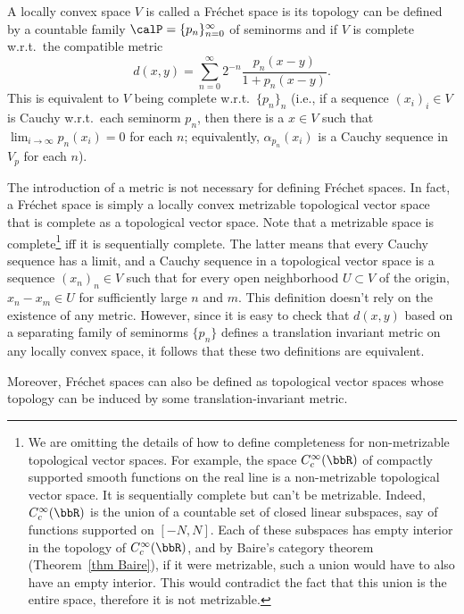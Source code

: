 \begin{defn}
    A locally convex space $V$ is called a Fr\'echet space is its topology can be defined by a countable family $\calP=\{p_n\}_{n=0}^\infty$ of seminorms and if $V$ is complete w.r.t.\ the compatible metric
    \[d(x,y)=\sum_{n=0}^\infty 2^{-n}\frac{p_n(x-y)}{1+p_n(x-y)}.\]
    This is equivalent to $V$ being complete w.r.t.\ $\{p_n\}_n$ (i.e., if a sequence $(x_i)_i\in V$ is Cauchy w.r.t.\ each seminorm $p_n$, then there is a $x\in V$ such that $\lim_{i\to\infty} p_n(x_i)=0$ for each $n$; equivalently, $\alpha_{p_n}(x_i)$ is a Cauchy sequence in $V_p$ for each $n$).
\end{defn}
\begin{rem}
    The introduction of a metric is not necessary for defining Fr\'echet spaces. In fact, a Fr\'echet space is simply a locally convex metrizable topological vector space that is complete as a topological vector space. Note that a metrizable space is complete\footnote{We are omitting the details of how to define completeness for non-metrizable topological vector spaces. For example, the space $C^\infty_c(\bbR)$ of compactly supported smooth functions on the real line is a non-metrizable topological vector space. It is sequentially complete but can't be metrizable. Indeed, $C^\infty_c(\bbR)$ is the union of a countable set of closed linear subspaces, say of functions supported on $[-N,N]$. Each of these subspaces has empty interior in the topology of $C^\infty_c(\bbR)$, and by Baire's category theorem (Theorem~\ref{thm Baire}), if it were metrizable, such a union would have to also have an empty interior. This would contradict the fact that this union is the entire space, therefore it is not metrizable.} iff it is sequentially complete. The latter means that every Cauchy sequence has a limit, and a Cauchy sequence in a topological vector space is a sequence $(x_n)_n\in V$ such that for every open neighborhood $U\subset V$ of the origin, $x_n-x_m\in U$ for sufficiently large $n$ and $m$. This definition doesn't rely on the existence of any metric. However, since it is easy to check that $d(x,y)$ based on a separating family of seminorms $\{p_n\}$ defines a translation invariant metric on any locally convex space, it follows that these two definitions are equivalent. 
    
    Moreover, Fr\'echet spaces can also be defined as topological vector spaces whose topology can be induced by some translation-invariant metric.
\end{rem}

